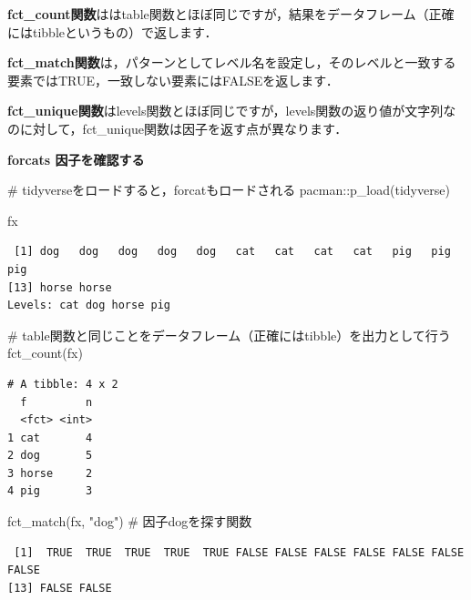 \documentclass[
  letterpaper,
  DIV=11,
  numbers=noendperiod]{scrreprt}
\newenvironment{Shaded}{\begin{snugshade}}{\end{snugshade}}
\newcommand{\CommentTok}[1]{\textcolor[rgb]{0.37,0.37,0.37}{#1}}
\newcommand{\FunctionTok}[1]{\textcolor[rgb]{0.28,0.35,0.67}{#1}}
\newcommand{\NormalTok}[1]{\textcolor[rgb]{0.00,0.23,0.31}{#1}}
\newcommand{\SpecialCharTok}[1]{\textcolor[rgb]{0.37,0.37,0.37}{#1}}
\newcommand{\StringTok}[1]{\textcolor[rgb]{0.13,0.47,0.30}{#1}}
\begin{document}
\textbf{fct\_count関数}ははtable関数とほぼ同じですが，結果をデータフレーム（正確にはtibbleというもの）で返します．

\textbf{fct\_match関数}は，パターンとしてレベル名を設定し，そのレベルと一致する要素ではTRUE，一致しない要素にはFALSEを返します．

\textbf{fct\_unique関数}はlevels関数とほぼ同じですが，levels関数の返り値が文字列なのに対して，fct\_unique関数は因子を返す点が異なります．

\textbf{forcats 因子を確認する}

\begin{Shaded}
\begin{Highlighting}[]
\CommentTok{\# tidyverseをロードすると，forcatもロードされる}
\NormalTok{pacman}\SpecialCharTok{::}\FunctionTok{p\_load}\NormalTok{(tidyverse)}

\NormalTok{fx}
\end{Highlighting}
\end{Shaded}

\begin{verbatim}
 [1] dog   dog   dog   dog   dog   cat   cat   cat   cat   pig   pig   pig  
[13] horse horse
Levels: cat dog horse pig
\end{verbatim}

\begin{Shaded}
\begin{Highlighting}[]
\CommentTok{\# table関数と同じことをデータフレーム（正確にはtibble）を出力として行う}
\FunctionTok{fct\_count}\NormalTok{(fx) }
\end{Highlighting}
\end{Shaded}

\begin{verbatim}
# A tibble: 4 x 2
  f         n
  <fct> <int>
1 cat       4
2 dog       5
3 horse     2
4 pig       3
\end{verbatim}

\begin{Shaded}
\begin{Highlighting}[]
\FunctionTok{fct\_match}\NormalTok{(fx, }\StringTok{"dog"}\NormalTok{) }\CommentTok{\# 因子dogを探す関数}
\end{Highlighting}
\end{Shaded}

\begin{verbatim}
 [1]  TRUE  TRUE  TRUE  TRUE  TRUE FALSE FALSE FALSE FALSE FALSE FALSE FALSE
[13] FALSE FALSE
\end{verbatim}
\end{document}
